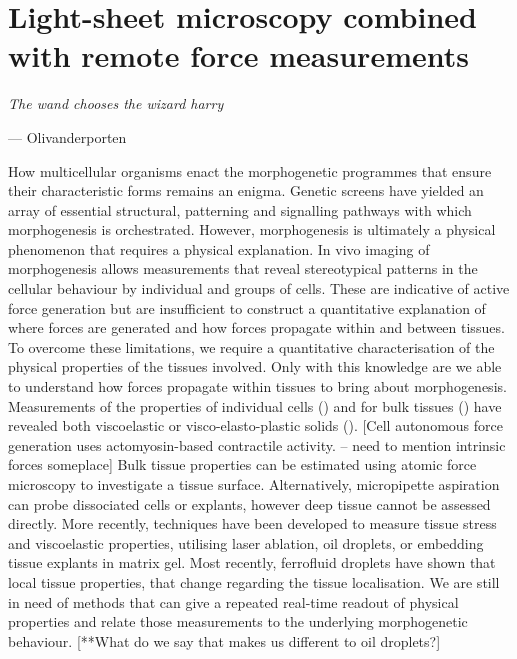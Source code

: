 \ifpdf
    \graphicspath{{Chapter/tweezers/Figs/Raster/}{Chapter/tweezers/Figs/PDF/}{Chapter/tweezers/Figs/}}
\else
    \graphicspath{{Chapter/tweezers/Figs/Vector/}{Chapter/tweezers/Figs/}}
\fi

\chapter[Light-sheet microscopy combined with remote force measurements]{Light-sheet microscopy combined with remote force measurements}%
\epigraph{\textit{The wand chooses the wizard harry}}{--- Olivanderporten}
How multicellular organisms enact the morphogenetic programmes that ensure their characteristic forms remains an enigma.
Genetic screens have yielded an array of essential structural, patterning and signalling pathways with which morphogenesis is orchestrated.
However, morphogenesis is ultimately a physical phenomenon that requires a physical explanation.
In vivo imaging of morphogenesis allows measurements that reveal stereotypical patterns in the cellular behaviour by individual and groups of cells.
These are indicative of active force generation but are insufficient to construct a quantitative explanation of where forces are generated and how forces propagate within and between tissues.
To overcome these limitations, we require a quantitative characterisation of the physical properties of the tissues involved.
Only with this knowledge are we able to understand how forces propagate within tissues to bring about morphogenesis.
Measurements of the properties of individual cells () and for bulk tissues () have revealed both viscoelastic or visco-elasto-plastic solids ().
[Cell autonomous force generation uses actomyosin-based contractile activity. – need to mention intrinsic forces someplace]   Bulk tissue properties can be estimated using atomic force microscopy to investigate a tissue surface.
Alternatively, micropipette aspiration can probe dissociated cells or explants, however deep tissue cannot be assessed directly.
More recently, techniques have been developed to measure tissue stress and viscoelastic properties, utilising laser ablation,  oil droplets, or embedding tissue explants in matrix gel.
Most recently, ferrofluid droplets have shown that local tissue properties, that change regarding the tissue localisation.
We are still in need of methods that can give a repeated real-time readout of physical properties and relate those measurements to the underlying morphogenetic behaviour.
[**What do we say that makes us different to oil droplets?]

